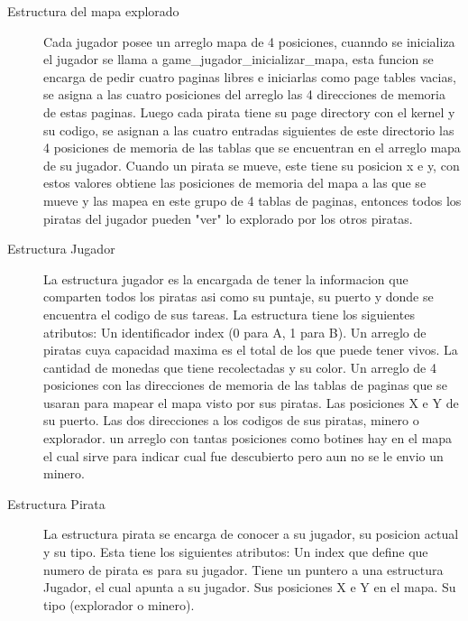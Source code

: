 \begin{description}
\item[Estructura del mapa explorado]
  Cada jugador posee un arreglo mapa de 4 posiciones, cuanndo se inicializa el jugador se llama a game_jugador_inicializar_mapa,
  esta funcion se encarga de pedir cuatro paginas libres e iniciarlas como page tables vacias, se asigna a las cuatro posiciones
  del arreglo las 4 direcciones de memoria de estas paginas.
  Luego cada pirata tiene su page directory con el kernel y su codigo, se asignan a las cuatro entradas siguientes de este directorio
  las 4 posiciones de memoria de las tablas que se encuentran en el arreglo mapa de su jugador.
  Cuando un pirata se mueve, este tiene su posicion x e y, con estos valores obtiene las posiciones de memoria del mapa a las que se mueve
  y las mapea en este grupo de 4 tablas de paginas, entonces todos los piratas del jugador pueden "ver" lo explorado por los
  otros piratas.

\item[Estructura Jugador]
  La estructura jugador es la encargada de tener la informacion que comparten todos los piratas asi como
  su puntaje, su puerto y donde se encuentra el codigo de sus tareas.
  La estructura tiene los siguientes atributos:
    Un identificador index (0 para A, 1 para B).
    Un arreglo de piratas cuya capacidad maxima es el total de los que puede tener vivos.
    La cantidad de monedas que tiene recolectadas y su color.
    Un arreglo de 4 posiciones con las direcciones de memoria de las tablas de paginas que se usaran para mapear el mapa visto por
    sus piratas.
    Las posiciones X e Y de su puerto.
    Las dos direcciones a los codigos de sus piratas, minero o explorador.
    un arreglo con tantas posiciones como botines hay en el mapa el cual sirve para indicar cual fue descubierto pero aun no se le envio
    un minero.

\item[Estructura Pirata]
  La estructura pirata se encarga de conocer a su jugador, su posicion actual y su tipo.
  Esta tiene los siguientes atributos:
    Un index que define que numero de pirata es para su jugador.
    Tiene un puntero a una estructura Jugador, el cual apunta a su jugador.
    Sus posiciones X e Y en el mapa.
    Su tipo (explorador o minero).


\end{description}

